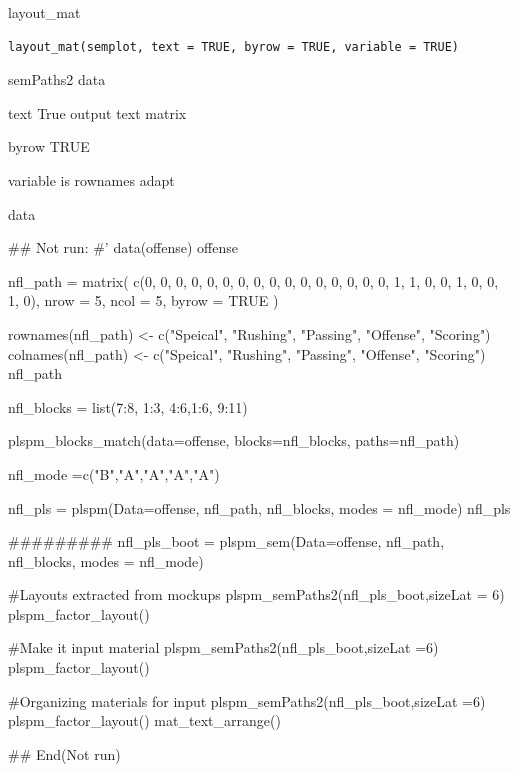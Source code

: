 \documentclass[a4paper]{book}
\begin{document}
%
\begin{Description}
layout\_mat
\end{Description}
%
\begin{Usage}
\begin{verbatim}
layout_mat(semplot, text = TRUE, byrow = TRUE, variable = TRUE)
\end{verbatim}
\end{Usage}
%
\begin{Arguments}
\begin{ldescription}
\item[\code{semplot}] semPaths2 data

\item[\code{text}] text True output text matrix

\item[\code{byrow}] byrow TRUE

\item[\code{variable}] variable is rownames adapt
\end{ldescription}
\end{Arguments}
%
\begin{Value}
data
\end{Value}
%
\begin{Examples}
\begin{ExampleCode}


\#\# Not run: 
#'
data(offense)
offense %

nfl_path = matrix(
  c(0, 0, 0, 0, 0,
    0, 0, 0, 0, 0,
    0, 0, 0, 0, 0,
    0, 1, 1, 0, 0,
    1, 0, 0, 1, 0),
  nrow = 5, ncol = 5, byrow = TRUE )

rownames(nfl_path) <- c("Speical", "Rushing", "Passing", "Offense", "Scoring")
colnames(nfl_path) <- c("Speical", "Rushing", "Passing", "Offense", "Scoring")
nfl_path

nfl_blocks = list(7:8, 1:3, 4:6,1:6, 9:11)

plspm_blocks_match(data=offense, blocks=nfl_blocks,
                   paths=nfl_path)

nfl_mode =c("B","A","A","A","A")

nfl_pls = plspm(Data=offense, nfl_path, nfl_blocks, modes = nfl_mode)
nfl_pls%

#########
nfl_pls_boot = plspm_sem(Data=offense, nfl_path, nfl_blocks, modes = nfl_mode)

#Layouts extracted from mockups
plspm_semPaths2(nfl_pls_boot,sizeLat = 6)%
  plspm_factor_layout()

#Make it input material
plspm_semPaths2(nfl_pls_boot,sizeLat =6)%
  plspm_factor_layout() %

#Organizing materials for input
plspm_semPaths2(nfl_pls_boot,sizeLat =6)%
  plspm_factor_layout() %
  mat_text_arrange()

## End(Not run)

\end{ExampleCode}
\end{Examples}
\end{document}
